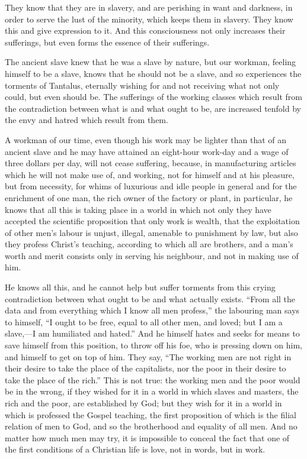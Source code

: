\documentclass{book}
\begin{document}
They know that they are in slavery, and are perishing in want and darkness, in order to serve the lust of the minority, which keeps them in slavery. They know this and give expression to it. And this consciousness not only increases their sufferings, but even forms the essence of their sufferings.

The ancient slave knew that he was a slave by nature, but our workman, feeling himself to be a slave, knows that he should not be a slave, and so experiences the torments of Tantalus, eternally wishing for and not receiving what not only could, but even should be. The sufferings of the working classes which result from the contradiction between what is and what ought to be, are increased tenfold by the envy and hatred which result from them.

A workman of our time, even though his work may be lighter than that of an ancient slave and he may have attained an eight-hour work-day and a wage of three dollars per day, will not cease suffering, because, in manufacturing articles which he will not make use of, and working, not for himself and at his pleasure, but from necessity, for whims of luxurious and idle people in general and for the enrichment of one man, the rich owner of the factory or plant, in particular, he knows that all this is taking place in a world in which not only they have accepted the scientific proposition that only work is wealth, that the exploitation of other men’s labour is unjust, illegal, amenable to punishment by law, but also they profess Christ’s teaching, according to which all are brothers, and a man’s worth and merit consists only in serving his neighbour, and not in making use of him.

He knows all this, and he cannot help but suffer torments from this crying contradiction between what ought to be and what actually exists. “From all the data and from everything which I know all men profess,” the labouring man says to himself, “I ought to be free, equal to all other men, and loved; but I am a slave,—I am humiliated and hated.” And he himself hates and seeks for means to save himself from this position, to throw off his foe, who is pressing down on him, and himself to get on top of him. They say, “The working men are not right in their desire to take the place of the capitalists, nor the poor in their desire to take the place of the rich.” This is not true: the working men and the poor would be in the wrong, if they wished for it in a world in which slaves and masters, the rich and the poor, are established by God; but they wish for it in a world in which is professed the Gospel teaching, the first proposition of which is the filial relation of men to God, and so the brotherhood and equality of all men. And no matter how much men may try, it is impossible to conceal the fact that one of the first conditions of a Christian life is love, not in words, but in work.
\end{document}
